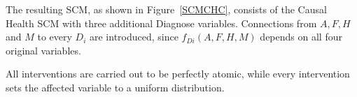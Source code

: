 \documentclass{article}
\begin{document}
The resulting SCM, as shown in Figure~\ref{SCMCHC}, consists of the Causal Health SCM with three additional Diagnose variables. Connections from $A, F, H$ and $M$ to every $D_i$ are introduced, since $f_{Di}(A, F, H, M)$ depends on all four original variables.

All interventions are carried out to be perfectly atomic, while every intervention sets the affected variable to a uniform distribution.


\end{document}
